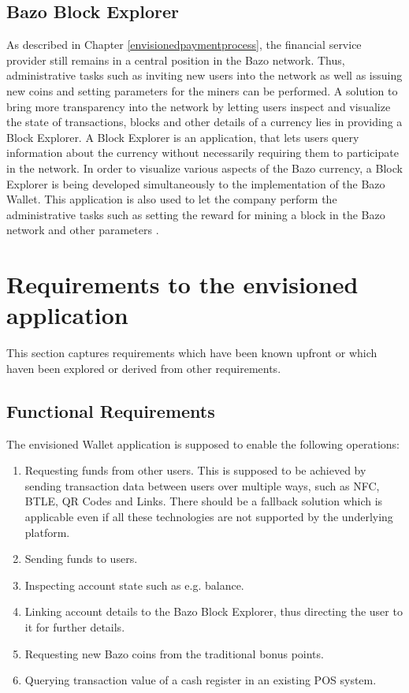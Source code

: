 \subsection{Bazo Block Explorer\label{bazoblockexplorer}}
As described in Chapter \ref{envisionedpaymentprocess}, the financial service provider still remains in a central position in the Bazo network. Thus, administrative tasks such as inviting new users into the network as well as issuing new coins and setting
parameters for the miners can be performed.
A solution to bring more transparency into the network by letting users inspect and visualize the state of transactions, blocks and other details of a currency lies in providing a Block Explorer. A Block Explorer is an application, that lets users query information about the currency without necessarily requiring them to participate in the network.
In order to visualize various aspects of the Bazo currency, a Block Explorer is being developed simultaneously to the implementation of the Bazo Wallet. This application is also used to let the company perform the administrative tasks such as setting the reward for mining a block in the Bazo network and other parameters \cite{bazoblockexplorer}.

\section{Requirements to the envisioned application}\label{requirements}
This section captures requirements which have been known upfront or which haven been explored or derived from other requirements.
\subsection{Functional Requirements}\label{functionalreq}
The envisioned Wallet application is supposed to enable the following operations:
\begin{enumerate}
\item Requesting funds from other users.
This is supposed to be achieved by sending transaction data between users over multiple ways, such as NFC, BTLE, QR Codes and Links. There should be a fallback solution which is applicable even if all these technologies are not supported by the underlying platform.
\item Sending funds to users.
\item Inspecting account state such as e.g. balance.
\item Linking account details to the Bazo Block Explorer, thus directing the user to it for further details.
\item Requesting new Bazo coins from the traditional bonus points.
\item Querying transaction value of a cash register in an existing POS system.


\end{enumerate}
